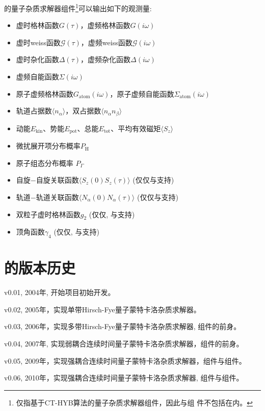 {\iqist}的量子杂质求解器组件\footnote{仅指基于CT-HYB算法的量子杂质求解器组件，因此{\daisy}与{\sakura}组
件不包括在内。}可以输出如下的观测量:
\begin{itemize}
\item 虚时格林函数$G(\tau)$，虚频格林函数$G(i\omega)$
\item 虚时weiss函数$\mathcal{G}(\tau)$，虚频weiss函数$\mathcal{G}(i\omega)$
\item 虚时杂化函数$\Delta(\tau)$，虚频杂化函数$\Delta(i\omega)$
\item 虚频自能函数$\Sigma(i\omega)$
\item 原子虚频格林函数$G_{\text{atom}}(i\omega)$，原子虚频自能函数$\Sigma_{\text{atom}}(i\omega)$
\item 轨道占据数$\langle n_{\alpha} \rangle$，双占据数$\langle n_{\alpha} n_{\beta} \rangle$
\item 动能$E_{\text{kin}}$、势能$E_{\text{pot}}$、总能$E_{\text{tot}}$、平均有效磁矩$\langle S_{z} \rangle$
\item 微扰展开项分布概率$P_{\text{H}}$
\item 原子组态分布概率 $P_{\Gamma}$
\item 自旋$-$自旋关联函数$\langle S_{z}(0) S_{z}(\tau) \rangle$ (仅仅{\gardenia}与{\narcissus}支持)
\item 轨道$-$轨道关联函数$\langle N_{\alpha}(0) N_{\alpha}(\tau) \rangle$ (仅仅{\gardenia}与{\narcissus}支持)
\item 双粒子虚时格林函数$g_{2}$ (仅仅{\gardenia}, {\narcissus}与{\lavender}支持)
\item 顶角函数$\gamma_{4}$ (仅仅{\gardenia}, {\narcissus}与{\lavender}支持)
\end{itemize}

\section{{\iqist}的版本历史}
\label{sec:history}

v0.01, 2004年, 开始项目初始开发。

v0.02, 2005年，实现单带Hirsch-Fye量子蒙特卡洛杂质求解器。

v0.03, 2006年，实现多带Hirsch-Fye量子蒙特卡洛杂质求解器, {\daisy}组件的前身。

v0.04, 2007年, 实现弱耦合连续时间量子蒙特卡洛杂质求解器，{\sakura}组件的前身。

v0.05, 2009年，实现强耦合连续时间量子蒙特卡洛杂质求解器，{\azalea}组件与{\hibiscus}组件。

v0.06, 2010年，实现强耦合连续时间量子蒙特卡洛杂质求解器, {\begonia}组件与{\jasmine}组件。

